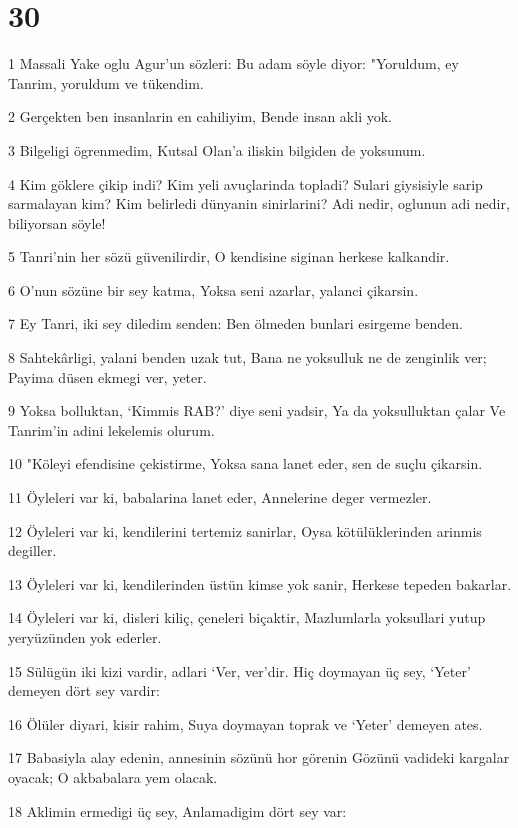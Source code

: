 \chapter{30}

\par 1 Massali Yake oglu Agur'un sözleri: Bu adam söyle diyor: "Yoruldum, ey Tanrim, yoruldum ve tükendim.
\par 2 Gerçekten ben insanlarin en cahiliyim, Bende insan akli yok.
\par 3 Bilgeligi ögrenmedim, Kutsal Olan'a iliskin bilgiden de yoksunum.
\par 4 Kim göklere çikip indi? Kim yeli avuçlarinda topladi? Sulari giysisiyle sarip sarmalayan kim? Kim belirledi dünyanin sinirlarini? Adi nedir, oglunun adi nedir, biliyorsan söyle!
\par 5 Tanri'nin her sözü güvenilirdir, O kendisine siginan herkese kalkandir.
\par 6 O'nun sözüne bir sey katma, Yoksa seni azarlar, yalanci çikarsin.
\par 7 Ey Tanri, iki sey diledim senden: Ben ölmeden bunlari esirgeme benden.
\par 8 Sahtekârligi, yalani benden uzak tut, Bana ne yoksulluk ne de zenginlik ver; Payima düsen ekmegi ver, yeter.
\par 9 Yoksa bolluktan, `Kimmis RAB?' diye seni yadsir, Ya da yoksulluktan çalar Ve Tanrim'in adini lekelemis olurum.
\par 10 "Köleyi efendisine çekistirme, Yoksa sana lanet eder, sen de suçlu çikarsin.
\par 11 Öyleleri var ki, babalarina lanet eder, Annelerine deger vermezler.
\par 12 Öyleleri var ki, kendilerini tertemiz sanirlar, Oysa kötülüklerinden arinmis degiller.
\par 13 Öyleleri var ki, kendilerinden üstün kimse yok sanir, Herkese tepeden bakarlar.
\par 14 Öyleleri var ki, disleri kiliç, çeneleri biçaktir, Mazlumlarla yoksullari yutup yeryüzünden yok ederler.
\par 15 Sülügün iki kizi vardir, adlari `Ver, ver'dir. Hiç doymayan üç sey, `Yeter' demeyen dört sey vardir:
\par 16 Ölüler diyari, kisir rahim, Suya doymayan toprak ve `Yeter' demeyen ates.
\par 17 Babasiyla alay edenin, annesinin sözünü hor görenin Gözünü vadideki kargalar oyacak; O akbabalara yem olacak.
\par 18 Aklimin ermedigi üç sey, Anlamadigim dört sey var:
